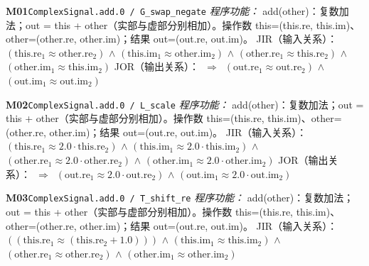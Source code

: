\documentclass[11pt]{article}
\begin{document}
\textbf{M01}\quad \texttt{ComplexSignal.add.0 / G\_swap\_negate}\newline
\hspace*{1.5em}\emph{程序功能：} add(other)：复数加法；out = this + other（实部与虚部分别相加）。操作数 this=(this.re, this.im)、other=(other.re, other.im)；结果 out=(out.re, out.im)。\newline
\hspace*{1.5em}JIR（输入关系）：\ $(\mathrm{this.re}_{1} \approx  \mathrm{other.re}_{2})$ $\wedge$ $(\mathrm{this.im}_{1} \approx  \mathrm{other.im}_{2})$ $\wedge$ $(\mathrm{other.re}_{1} \approx  \mathrm{this.re}_{2})$ $\wedge$ $(\mathrm{other.im}_{1} \approx  \mathrm{this.im}_{2})$\newline
\hspace*{1.5em}JOR（输出关系）：\ $\Rightarrow$\ $(\mathrm{out.re}_{1} \approx  \mathrm{out.re}_{2})$ $\wedge$ $(\mathrm{out.im}_{1} \approx  \mathrm{out.im}_{2})$\par\medskip
\textbf{M02}\quad \texttt{ComplexSignal.add.0 / L\_scale}\newline
\hspace*{1.5em}\emph{程序功能：} add(other)：复数加法；out = this + other（实部与虚部分别相加）。操作数 this=(this.re, this.im)、other=(other.re, other.im)；结果 out=(out.re, out.im)。\newline
\hspace*{1.5em}JIR（输入关系）：\ $(\mathrm{this.re}_{1} \approx  2.0\cdot \mathrm{this.re}_{2})$ $\wedge$ $(\mathrm{this.im}_{1} \approx  2.0\cdot \mathrm{this.im}_{2})$ $\wedge$ $(\mathrm{other.re}_{1} \approx  2.0\cdot \mathrm{other.re}_{2})$ $\wedge$ $(\mathrm{other.im}_{1} \approx  2.0\cdot \mathrm{other.im}_{2})$\newline
\hspace*{1.5em}JOR（输出关系）：\ $\Rightarrow$\ $(\mathrm{out.re}_{1} \approx  2.0\cdot \mathrm{out.re}_{2})$ $\wedge$ $(\mathrm{out.im}_{1} \approx  2.0\cdot \mathrm{out.im}_{2})$\par\medskip
\textbf{M03}\quad \texttt{ComplexSignal.add.0 / T\_shift\_re}\newline
\hspace*{1.5em}\emph{程序功能：} add(other)：复数加法；out = this + other（实部与虚部分别相加）。操作数 this=(this.re, this.im)、other=(other.re, other.im)；结果 out=(out.re, out.im)。\newline
\hspace*{1.5em}JIR（输入关系）：\ $((\mathrm{this.re}_{1} \approx  (\mathrm{this.re}_{2} + 1.0)))$ $\wedge$ $(\mathrm{this.im}_{1} \approx  \mathrm{this.im}_{2})$ $\wedge$ $(\mathrm{other.re}_{1} \approx  \mathrm{other.re}_{2})$ $\wedge$ $(\mathrm{other.im}_{1} \approx  \mathrm{other.im}_{2})$\newline
\end{document}
